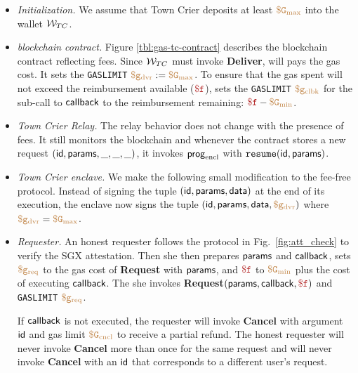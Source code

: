 \begin{itemize}[leftmargin=1.5em]
  \setlength{\itemsep}{0pt}
  \setlength{\parsep}{0pt}
  \item {\it Initialization.}
    We assume that Town Crier deposits at least $\tt {\color{brown} \$G_\text{max} }$ into the wallet ${\cal W}_{TC}$.

  \item {\it \tcs blockchain contract.}
    Figure \ref{tbl:gas-tc-contract} describes the \tcs blockchain contract reflecting fees.
    Since ${\cal W}_{TC}$ must invoke {\bf Deliver}, \tc will pays the gas cost.
    It sets the {\tt GASLIMIT} $\tt {\color{brown} \$g_\text{dvr} } := \tt {\color{brown} \$G_\text{max} }$.
    To ensure that the gas spent will not exceed the reimbursement available ($\fee$),
    \tcont sets the {\tt GASLIMIT} $\tt {\color{brown} \$g_\text{clbk} }$ for the sub-call to ${\sf callback}$ to the reimbursement remaining: $\fee - \constgasmin$.

  \item {\it Town Crier Relay.}
    The relay behavior does not change with the presence of fees.
    It still monitors the blockchain and whenever the contract \tcont stores a new request $({\sf id}, {\sf params}, \_, \_, \_)$,
    it invokes ${\sf prog}_{\textrm{encl}}$ with $\texttt{resume}({\sf id}, {\sf params})$.

  \item {\it Town Crier enclave.}
    We make the following small modification to the fee-free protocol.
    Instead of signing the tuple $({\sf id}, {\sf params}, {\sf data})$ at the end of its execution,
    the enclave now signs the tuple $({\sf id}, {\sf params}, {\sf data}, \tt {\color{brown} \$g_\text{dvr} })$ where $\tt {\color{brown} \$g_\text{dvr} } = \tt {\color{brown} \$G_\text{max} }$.

  \item {\it Requester.}
    An honest requester follows the protocol in Fig.~\ref{fig:att_check} to verify the SGX attestation.
    Then she then prepares ${\sf params}$ and ${\sf callback}$, sets $\tt {\color{brown} \$g_\text{req} }$ to the gas cost of {\bf Request} with ${\sf params}$,
    and $\fee$ to $\tt {\color{brown} \$G_\text{min} }$ plus the cost of executing ${\sf callback}$.
    The she invokes {\bf Request}$(\dgform, \dgcallback, \fee)$ and {\tt GASLIMIT} $\tt {\color{brown} \$g_\text{req} }$.

    If ${\sf callback}$ is not executed, the requester will invoke {\bf Cancel} with argument ${\sf id}$ and gas limit $\tt {\color{brown} \$G_\text{cncl} }$ to receive a partial refund.
    The honest requester will never invoke {\bf Cancel} more than once for the same request
    and will never invoke {\bf Cancel} with an ${\sf id}$ that corresponds to a different user's request.
\end{itemize}

